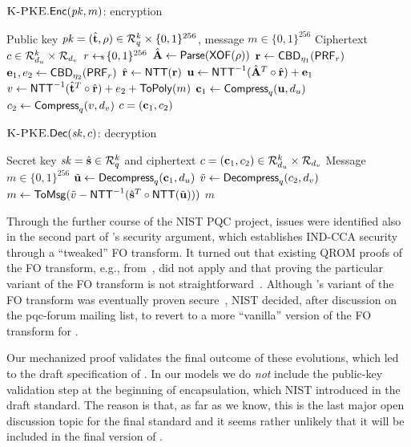 \begin{algorithm}[tb]
  \caption{$\text{{\sc K-PKE}}.\mathsf{Enc}(\mathit{pk}, m)$: encryption}
  \label{alg:enc}
  \begin{algorithmic}[1]
    \Require Public key $\mathit{pk}  = (\hat{\mathbf{t}}, \rho) \in \mathcal{R}_q^k \times \{0,1\}^{256}$, message $m \in \{0,1\}^{256}$
    \Ensure Ciphertext $c \in \mathcal{R}_{d_u}^k \times \mathcal{R}_{d_v}$
    \State $r \leftarrow \!\!\! \mbox{\tiny \$}\, \{0,1\}^{256}$
    \State $\hat{\mathbf{A}} \gets \mathsf{Parse}(\mathsf{XOF}(\rho))$
    \State $\mathbf{r} \gets \mathsf{CBD}_{\eta_1}(\mathsf{PRF}_r)$ 
    \State $\mathbf{e}_1, e_2 \gets \mathsf{CBD}_{\eta_2}(\mathsf{PRF}_r)$ 
    \State $\hat{\mathbf{r}} \gets \mbox{\textsf{NTT}}(\mathbf{r})$\label{line:kybercpa-enc:nttr}
    \State $\mathbf{u} \gets \mbox{\textsf{NTT}}^{-1}(\hat{\mathbf{A}}^T \circ \hat{\mathbf{r}}) + \mathbf{e}_1$
    \State $v \gets \mbox{\textsf{NTT}}^{-1}(\hat{\mathbf{t}}^T\circ\hat{\mathbf{r}}) + e_2 + \mathsf{ToPoly}(m)$ 
    \State $\mathbf{c}_1 \gets \mathsf{Compress}_q(\mathbf{u}, d_u)$
    \State $c_2 \gets \mathsf{Compress}_q(v, d_v)$
    \State \Return $c = (\mathbf{c}_1, c_2)$
  \end{algorithmic}
\end{algorithm}

\begin{algorithm}[tb]
  \caption{$\text{{\sc K-PKE}}.\mathsf{Dec}(\mathit{sk},c)$: decryption}
  \label{alg:dec}
  \begin{algorithmic}[1]
    \Require Secret key $\mathit{sk} = \hat{\mathbf{s}} \in \mathcal{R}_q^k$ and ciphertext $c = (\mathbf{c}_1, c_2)\in \mathcal{R}_{d_u}^k \times \mathcal{R}_{d_v}$
    \Ensure Message $m \in \{0,1\}^{256}$
    \State $\tilde{\mathbf{u}} \gets \mathsf{Decompress}_q(\mathbf{c}_1, d_u)$
    \State $\tilde{v} \gets \mathsf{Decompress}_q(c_2, d_v)$
    \State $m \gets \mathsf{ToMsg}(\tilde{v}-\mbox{\textsf{NTT}}^{-1}(\hat{\mathbf{s}}^T\circ\mbox{\textsf{NTT}}(\tilde{\mathbf{u}})))$
    \State \Return $m$
\end{algorithmic}
\end{algorithm}

Through the further course of the NIST PQC project, issues were
identified also in the second part of \kyber's security argument, 
which establishes IND-CCA security through a ``tweaked'' FO transform.  
It turned out that existing QROM proofs of the FO transform,
e.g., from~\cite{TCC:HofHovKil17}, did not apply and that proving the particular
variant of the FO transform is not straightforward~\cite[Sec.~5.4]{EC:GruMarPat22}. 
Although \kyber's variant of the FO transform was eventually proven
secure~\cite{PKC:MarXag23,EPRINT:BarHul23}, NIST decided, 
after discussion on the pqc-forum mailing list, 
to revert to a more ``vanilla'' version of the FO
transform for \mlkem.

Our mechanized proof validates the final outcome of these evolutions, 
which led to the draft specification of \mlkem. 
In our models we do \emph{not} include
the public-key validation step at the beginning of encapsulation, 
which NIST introduced in the \mlkem draft standard. 
The reason is that, as far as we know, this is the last major 
open discussion topic for the final standard and it seems rather 
unlikely that it will be included in the final version of \mlkem.

